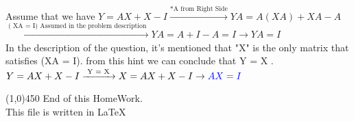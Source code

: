 \documentclass[a4paper,12pt]{article}
\begin{document}
\begin{doublespace}
Assume that we have $Y = AX + X - I \xrightarrow{\text{*A from Right Side}}  YA = A(XA) + XA - A $\\
$  \xrightarrow{\text{( XA = I) Assumed in the problem description }} YA = A + I - A = I \rightarrow YA = I $ \\
In the description of the question, it's mentioned that "X" is the only matrix that satisfies (XA = I). from this hint we can conclude that Y = X . \\
$Y = AX + X - I \xrightarrow{\text{ Y =  X }} X = AX + X - I   \rightarrow  \textcolor{blue}{AX = I}  $
\end{doublespace}
\line(1,0){450}
\newpage
End of this HomeWork.\\
This file is written in \LaTeX
\end{document}
